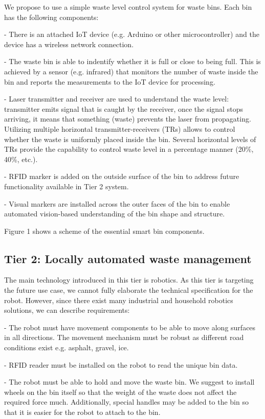 \documentclass{article}
\begin{document}
We propose to use a simple waste level control system for waste bins. Each bin has the following
components:

- There is an attached IoT device (e.g. Arduino or other microcontroller) and the device has a
wireless network connection.

- The waste bin is able to indentify whether it is full or close to being full. This is achieved by
a sensor (e.g. infrared) that monitors the number of waste inside the bin and reports the
measurements to the IoT device for processing.

- Laser transmitter and receiver are used to understand the waste level: transmitter emits signal
that is caught by the receiver, once the signal stops arriving, it means that something (waste)
prevents the laser from propagating. Utilizing multiple horizontal transmitter-receivers (TRs)
allows to control whether the waste is uniformly placed inside the bin. Several horizontal levels of
TRs provide the capability to control waste level in a percentage manner (20\%, 40\%, etc.).

- RFID marker  is added on the outside surface of the bin to address future functionality available
in Tier 2 system.

- Visual markers are installed across the outer faces of the bin to enable automated vision-based
understanding of the bin shape and structure.

Figure 1 shows a scheme of the essential smart bin components.

\subsection{Tier 2: Locally automated waste management}

The main technology introduced in this tier is robotics. As this tier is targeting the future use
case, we cannot fully elaborate the technical specification for the robot. However, since there
exist many industrial and household robotics solutions, we can describe requirements:

- The robot must have movement components to be able to move along surfaces in all directions. The
movement mechanism must be robust as different road conditions exist e.g. asphalt, gravel, ice.

- RFID reader must be installed on the robot to read the unique bin data.

- The robot must be able to hold and move the waste bin. We suggest to install wheels on the bin
itself so that the weight of the waste does not affect the required force much. Additionally,
special handles may be added to the bin so that it is easier for the robot to attach to the bin.
\end{document}
